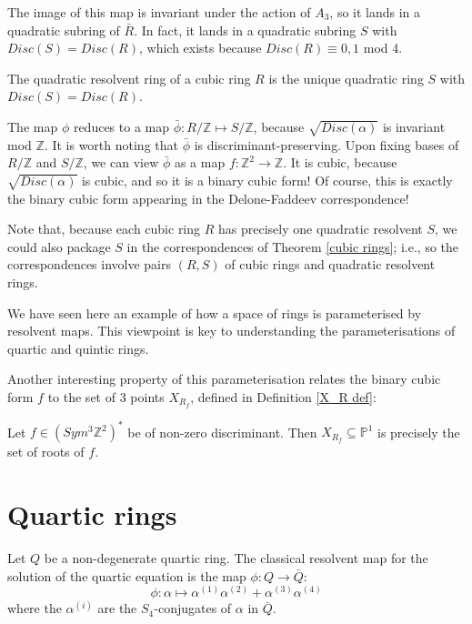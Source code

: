 \documentclass{report}
\begin{document}
The image of this map is invariant under the action of $A_3$, so it lands in a quadratic subring of $\bar{R}$.  In fact, it lands in a quadratic subring $S$ with $Disc(S) = Disc(R)$, which exists because $Disc(R) \equiv 0,1$ mod 4.

\begin{definition}
The quadratic resolvent ring of a cubic ring $R$ is the unique quadratic ring $S$ with $Disc(S) = Disc(R)$.
\end{definition}

The map $\phi$ reduces to a map $\bar{\phi} : R / \mathbb{Z} \mapsto S / \mathbb{Z}$, because $\sqrt{Disc(\alpha)}$ is invariant mod $\mathbb{Z}$.  It is worth noting that $\bar{\phi}$ is discriminant-preserving.  Upon fixing bases of $R / \mathbb{Z}$ and $S / \mathbb{Z}$, we can view $\bar{\phi}$ as a map $f : \mathbb{Z}^2 \to \mathbb{Z}$.  It is cubic, because $\sqrt{Disc(\alpha)}$ is cubic, and so it is a binary cubic form!  Of course, this is exactly the binary cubic form appearing in the Delone-Faddeev correspondence!

Note that, because each cubic ring $R$ has precisely one quadratic resolvent $S$, we could also package $S$ in the correspondences of Theorem \ref{cubic rings}; i.e., so the correspondences involve pairs $(R,S)$ of cubic rings and quadratic resolvent rings.

We have seen here an example of how a space of rings is parameterised by resolvent maps.  This viewpoint is key to understanding the parameterisations of quartic and quintic rings.

Another interesting property of this parameterisation relates the binary cubic form $f$ to the set of 3 points $X_{R_f}$, defined in Definition \ref{X_R def}:
\begin{lemma} \label{X_R cubic}
Let $f \in (Sym^3 \mathbb{Z}^2)^*$ be of non-zero discriminant.  Then $X_{R_f} \subseteq \mathbb{P}^1$ is precisely the set of roots of $f$.
\end{lemma}

\section{Quartic rings}

Let $Q$ be a non-degenerate quartic ring.  The classical resolvent map for the solution of the quartic equation is the map $\phi : Q \to \bar{Q}$:
\begin{equation}
\phi: \alpha \mapsto \alpha^{(1)} \alpha^{(2)} + \alpha^{(3)} \alpha^{(4)}
\end{equation}
where the $\alpha^{(i)}$ are the $S_4$-conjugates of $\alpha$ in $\bar{Q}$.
\end{document}
